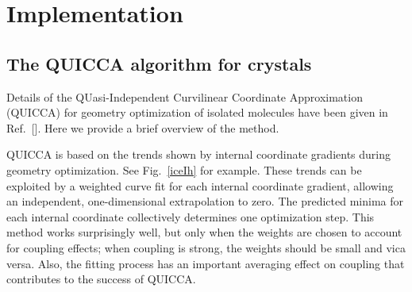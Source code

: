 \twolinestyle{\documentclass[prb,preprint]{revtex4}}
\begin{document}
\section{Implementation} \label{implementation}


\subsection{The QUICCA algorithm for crystals} 

Details of the QUasi-Independent Curvilinear Coordinate Approximation 
(QUICCA) for geometry optimization of isolated molecules have been 
given in Ref.~[].  Here we provide a brief overview 
of the method.  

QUICCA is based on the trends shown by internal coordinate 
gradients during geometry optimization.  See Fig.~\ref{iceIh} for example.
These trends can be exploited by a weighted curve fit for each internal 
coordinate gradient,  allowing an independent, one-dimensional extrapolation 
to zero. The predicted minima for each internal coordinate  collectively 
determines one optimization step.  This method works surprisingly well, but 
only when the weights are chosen to account for coupling effects;  when 
coupling is strong, the weights should be small and vica versa.  Also, the
fitting process has an important averaging effect on coupling that contributes 
to the success of QUICCA.
\end{document}
